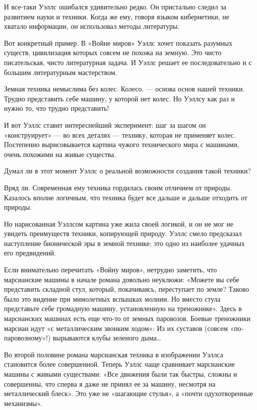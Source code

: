 И все-таки  Уэллс  ошибался удивительно  редко.  Он пристально  следил  за
развитием науки и  техники. Когда  же ему, говоря  языком кибернетики,  не
хватало информации, он использовал методы литературы.

Вот конкретный  пример.  В «Войне  миров»  Уэллс хочет  показать  разумных
существ, цивилизация  которых  совсем  не  похожа  на  земную.  Это  чисто
писательская, чисто литературная задача. И Уэллс решает ее последовательно
и с большим литературным мастерством.

Земная техника немыслима без колес. Колесо. — основа основ нашей  техники.
Трудно представить себе машину, у которой  нет колес. Но Уэллсу как раз  и
нужно то, что трудно представить!

И  вот  Уэллс   ставит  интереснейший   эксперимент:  шаг   за  шагом   он
«конструирует» — во всех  деталях — технику,  которая не применяет  колес.
Постепенно вырисовывается  картина чужого  технического мира  с  машинами,
очень похожими на живые существа.

Думал ли  в  этот  момент  Уэллс о  реальной  возможности  создания  такой
техники?

Вряд ли.  Современная ему  техника гордилась  своим отличием  от  природы.
Казалось вполне логичным, что техника  будет все дальше и дальше  отходить
от природы.

Но нарисованная Уэллсом  картина уже жила  своей логикой, и  он не мог  не
увидеть преимуществ техники,  копирующей природу.  Уэллс смело  предсказал
наступление бионической эры в земной технике; это одно из наиболее удачных
его предвидений.

Если  внимательно  перечитать  «Войну   миров»,  нетрудно  заметить,   что
марсианские машины  в начале  романа довольно  неуклюжи: «Можете  вы  себе
представить складной  стул, который,  покачиваясь, переступает  по  земле?
Таково было это видение  при мимолетных вспышках  молнии. Но вместо  стула
представьте себе громадную машину,  установленную на треножнике». Здесь  в
марсианских машинах есть еще что-то от земных паровозов. Боевые треножники
марсиан идут  «с  металлическим звонким  ходом»:  Из их  суставов  (совсем
«по-паровозному»!) вырываются клубы зеленого дыма…

Во  второй  половине  романа  марсианская  техника  в  изображении  Уэллса
становится более  совершенной. Теперь  Уэллс чаще  сравнивает  марсианские
машины с  живыми  существами: «Все  движения  были так  быстры,  сложны  и
совершенны, что  сперва  я  даже  не принял  ее  за  машину,  несмотря  на
металлический  блеск».   Это   уже   не  «шагающие   стулья»,   а   «почти
одухотворенные механизмы».

